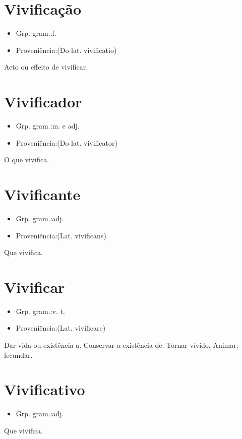 \documentclass{article}
\begin{document}
\section{Vivificação}
\begin{itemize}
\item {Grp. gram.:f.}
\end{itemize}
\begin{itemize}
\item {Proveniência:(Do lat. \textunderscore vivificatio\textunderscore )}
\end{itemize}
Acto ou effeito de vivificar.
\section{Vivificador}
\begin{itemize}
\item {Grp. gram.:m.  e  adj.}
\end{itemize}
\begin{itemize}
\item {Proveniência:(Do lat. \textunderscore vivificator\textunderscore )}
\end{itemize}
O que vivifica.
\section{Vivificante}
\begin{itemize}
\item {Grp. gram.:adj.}
\end{itemize}
\begin{itemize}
\item {Proveniência:(Lat. \textunderscore vivificans\textunderscore )}
\end{itemize}
Que vivifica.
\section{Vivificar}
\begin{itemize}
\item {Grp. gram.:v. t.}
\end{itemize}
\begin{itemize}
\item {Proveniência:(Lat. \textunderscore vivificare\textunderscore )}
\end{itemize}
Dar vida ou existência a.
Conservar a existência de.
Tornar vívido.
Animar; fecundar.
\section{Vivificativo}
\begin{itemize}
\item {Grp. gram.:adj.}
\end{itemize}
Que vivifica.
\end{document}
